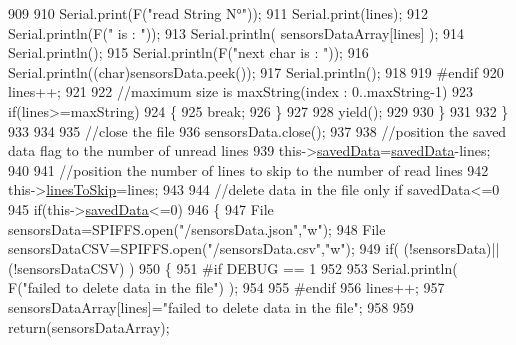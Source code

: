 \begin{DoxyCode}
909      
910                 Serial.print(F(\textcolor{stringliteral}{"read String N°"}));
911                 Serial.print(lines);
912                 Serial.println(F(\textcolor{stringliteral}{" is : "}));
913                 Serial.println( sensorsDataArray[lines] );
914                 Serial.println();
915                 Serial.println(F(\textcolor{stringliteral}{"next char is : "}));
916                 Serial.println((\textcolor{keywordtype}{char})sensorsData.peek());
917                 Serial.println();           
918             
919 \textcolor{preprocessor}{            #endif}
920                 lines++;
921             
922                 \textcolor{comment}{//maximum size is maxString(index : 0..maxString-1)}
923                 \textcolor{keywordflow}{if}(lines>=maxString)
924                 \{
925                     \textcolor{keywordflow}{break};
926                 \}
927             
928                 yield();
929             
930             \}
931 
932         \}
933         
934                     
935         \textcolor{comment}{//close the file}
936         sensorsData.close();
937 
938         \textcolor{comment}{//position the saved data flag to the number of unread lines}
939         this->\hyperlink{class_cool_file_system_ad9f5b739a32100f5f21270c3d9ee2b1d}{savedData}=\hyperlink{class_cool_file_system_ad9f5b739a32100f5f21270c3d9ee2b1d}{savedData}-lines;
940         
941         \textcolor{comment}{//position the number of lines to skip to the number of read lines  }
942         this->\hyperlink{class_cool_file_system_a84fdb6057e534b395512463daa28ea3c}{linesToSkip}=lines;
943 
944         \textcolor{comment}{//delete data in the file only if savedData<=0}
945         \textcolor{keywordflow}{if}(this->\hyperlink{class_cool_file_system_ad9f5b739a32100f5f21270c3d9ee2b1d}{savedData}<=0)
946         \{
947             File sensorsData=SPIFFS.open(\textcolor{stringliteral}{"/sensorsData.json"},\textcolor{stringliteral}{"w"});
948             File sensorsDataCSV=SPIFFS.open(\textcolor{stringliteral}{"/sensorsData.csv"},\textcolor{stringliteral}{"w"});
949             \textcolor{keywordflow}{if}( (!sensorsData)||(!sensorsDataCSV) ) 
950             \{
951 \textcolor{preprocessor}{            #if DEBUG == 1}
952     
953                 Serial.println( F(\textcolor{stringliteral}{"failed to delete data in the file"}) );
954     
955 \textcolor{preprocessor}{            #endif}
956                 lines++;
957                 sensorsDataArray[lines]=\textcolor{stringliteral}{"failed to delete data in the file"};
958 
959                 \textcolor{keywordflow}{return}(sensorsDataArray);

\end{DoxyCode}

